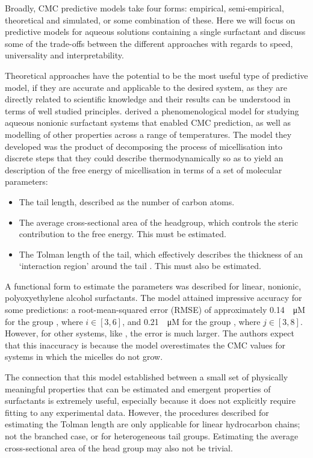 Broadly, CMC predictive models take four forms: empirical, semi-empirical,
theoretical and simulated, or some combination of these. Here we will focus on
predictive models for aqueous solutions containing a single surfactant and
discuss some of the trade-offs between the different approaches with regards to
speed, universality and interpretability.

Theoretical approaches have the potential to be the most useful type of
predictive model, if they are accurate and applicable to the desired system, as
they are directly related to scientific knowledge and their results can be
understood in terms of well studied principles.
\citet{puvvadaMolecularThermodynamicApproach1990} derived a phenomenological
model for studying aqueous nonionic surfactant systems that enabled CMC
prediction, as well as modelling of other properties across a range of
temperatures. The model they developed was the product of decomposing the
process of micellisation into discrete steps that they could describe
thermodynamically so as to yield an description of the free energy of
micellisation in terms of a set of molecular parameters:

\begin{itemize}
    \item The tail length, described as the number of carbon atoms.
    \item The average cross-sectional area of the headgroup, which controls the
          steric contribution to the free energy. This must be estimated.
    \item The Tolman length of the tail, which effectively describes the
          thickness of an `interaction region' around the tail
          \cite{demiguelGibbsThermodynamicsSurface2021}. This must also be estimated.
\end{itemize}

A functional form to estimate the parameters was described for linear, nonionic,
polyoxyethylene alcohol surfactants. The model attained impressive accuracy for
some predictions: a root-mean-squared error (RMSE) of approximately
\SI{0.14}{\log \micro M} for the group , where $i \in [3, 6]$, and
\SI{0.21}{\log \micro M} for the group , where $j \in [3, 8]$.
However, for other systems, like , the error is much larger. The
authors expect that this inaccuracy is because the model overestimates the CMC
values for systems in which the micelles do not grow.

The connection that this model established between a small set of physically
meaningful properties that can be estimated and emergent properties of
surfactants is extremely useful, especially because it does not explicitly
require fitting to any experimental data. However, the procedures described for
estimating the Tolman length are only applicable for linear hydrocarbon chains;
not the branched case, or for heterogeneous tail groups. Estimating the average
cross-sectional area of the head group may also not be trivial.

